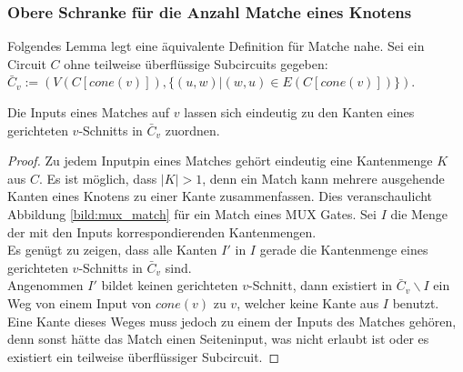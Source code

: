 \documentclass[11pt, a4paper, german]{article}
\begin{document}
\subsubsection{Obere Schranke für die Anzahl Matche eines Knotens}
\label{subsubsec:anzahl_matchings}
Folgendes Lemma legt eine äquivalente Definition für Matche nahe.
Sei ein Circuit $C$ ohne teilweise überflüssige Subcircuits gegeben: \\$\bar{C}_v := (V(C[cone(v)]), \{ (u,w) | (w,u) \in E(C[cone(v)])\})$.
\begin{lemma}{Die Inputs eines Matches auf $v$ lassen sich eindeutig zu den Kanten eines gerichteten $v$-Schnitts in $\bar{C}_v $} zuordnen.
\end{lemma}
\begin{proof}
Zu jedem Inputpin eines Matches gehört eindeutig eine Kantenmenge $K$ aus $C$. Es ist möglich, dass $|K| > 1$, denn ein Match kann mehrere ausgehende Kanten eines Knotens zu einer Kante zusammenfassen. Dies veranschaulicht Abbildung \ref{bild:mux_match} für ein Match eines MUX Gates.  Sei $I$ die Menge der mit den Inputs korrespondierenden Kantenmengen.\\
Es genügt zu zeigen, dass alle Kanten $I'$ in $I$ gerade die Kantenmenge eines gerichteten $v$-Schnitts in $\bar{C}_v$ sind. \\
Angenommen $I'$ bildet keinen gerichteten $v$-Schnitt, dann existiert in $\bar{C}_v\backslash I$ ein Weg von einem Input von $cone(v)$ zu $v$, welcher keine Kante aus $I$ benutzt. \\
Eine Kante dieses Weges muss jedoch zu einem der Inputs des Matches gehören, denn sonst hätte das Match einen Seiteninput, was nicht erlaubt ist oder es existiert ein teilweise überflüssiger Subcircuit. 
\end{proof}
\end{document}
